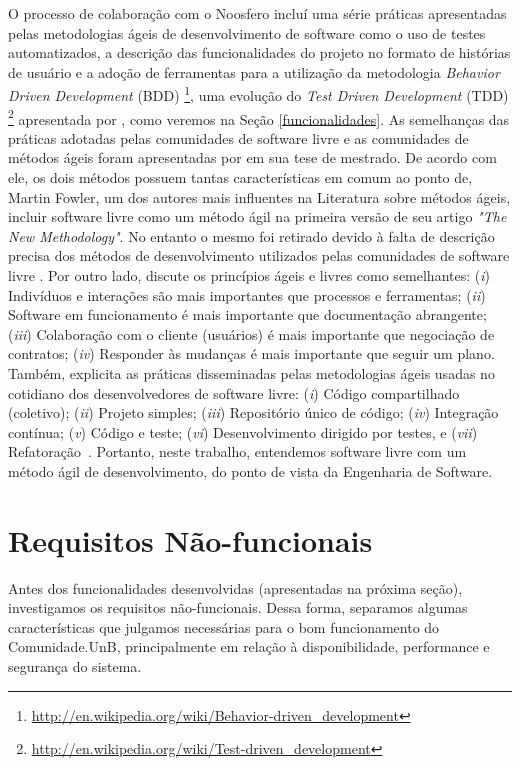 O processo de colaboração com o Noosfero incluí uma série práticas apresentadas
pelas metodologias ágeis de desenvolvimento de software como o uso de testes
automatizados, a descrição das funcionalidades do projeto no formato de
histórias de usuário e a adoção de ferramentas para a utilização da metodologia
\textit{Behavior Driven Development} (BDD)%
\footnote{\url{http://en.wikipedia.org/wiki/Behavior-driven_development}},
uma evolução do \textit{Test Driven Development} (TDD)%
\footnote{\url{http://en.wikipedia.org/wiki/Test-driven_development}}
apresentada por , como veremos na Seção
\ref{funcionalidades}.
%
As semelhanças das práticas adotadas pelas comunidades de software livre e as
comunidades de métodos ágeis foram apresentadas por 
em sua tese de mestrado. De acordo com ele, os dois
métodos possuem tantas características em comum ao ponto de, Martin Fowler,
um dos autores mais influentes na Literatura sobre métodos ágeis,
incluir software livre como um método ágil na primeira versão de seu artigo
\textit{"The New Methodology"}. No entanto o mesmo foi retirado devido
à falta de descrição precisa dos métodos de desenvolvimento utilizados pelas
comunidades de software livre .
%
Por outro lado,  discute os princípios ágeis e livres
como semelhantes:
%
(\textit{i}) Indivíduos e interações são mais importantes que processos e
ferramentas;
(\textit{ii}) Software em funcionamento é mais importante que documentação
abrangente;
(\textit{iii}) Colaboração com o cliente (usuários) é mais importante que
negociação de contratos;
(\textit{iv}) Responder às mudanças é mais importante que seguir um plano.
%
Também, explicita as práticas disseminadas pelas metodologias ágeis usadas no
cotidiano dos desenvolvedores de software livre:
(\textit{i}) Código compartilhado (coletivo);
(\textit{ii}) Projeto simples;
(\textit{iii}) Repositório único de código;
(\textit{iv}) Integração contínua;
(\textit{v}) Código e teste;
(\textit{vi}) Desenvolvimento dirigido por testes, e
(\textit{vii}) Refatoração~\cite{corbucci2011}. Portanto, neste trabalho,
entendemos software livre com um método ágil de desenvolvimento, do ponto de
vista da Engenharia de Software.

\section{Requisitos Não-funcionais}
\label{sec:non-functional-req}

Antes dos funcionalidades desenvolvidas (apresentadas na próxima seção),
investigamos os requisitos não-funcionais. Dessa forma, separamos algumas
características que julgamos necessárias para o bom funcionamento do
Comunidade.UnB, principalmente em relação à disponibilidade, performance e
segurança do sistema.

